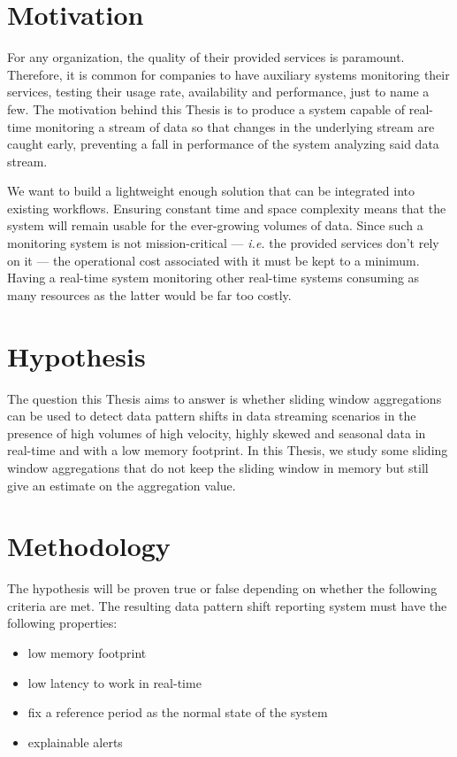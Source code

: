 \section{Motivation} \label{sec:motivation}
For any organization, the quality of their provided services is paramount. Therefore, it is common for companies to have auxiliary systems monitoring their services, testing their usage rate, availability and performance, just to name a few. The motivation behind this Thesis is to produce a system capable of real-time monitoring a stream of data so that changes in the underlying stream are caught early, preventing a fall in performance of the system analyzing said data stream. 

We want to build a lightweight enough solution that can be integrated into existing workflows. Ensuring constant time and space complexity means that the system will remain usable for the ever-growing volumes of data. Since such a monitoring system is not mission-critical --- \textit{i.e.} the provided services don't rely on it --- the operational cost associated with it must be kept to a minimum. Having a real-time system monitoring other real-time systems consuming as many resources as the latter would be far too costly.

\section{Hypothesis} \label{sec:hypothesis}
The question this Thesis aims to answer is whether sliding window aggregations can be used to detect data pattern shifts in data streaming scenarios in the presence of high volumes of high velocity, highly skewed and seasonal data in real-time and with a low memory footprint. In this Thesis, we study some sliding window aggregations that do not keep the sliding window in memory but still give an estimate on the aggregation value.

\section{Methodology} \label{sec:methodology}

The hypothesis will be proven true or false depending on whether the following criteria are met. The resulting data pattern shift reporting system must have the following properties:
\begin{itemize}
    \item low memory footprint
    
    \item low latency to work in real-time
    
    \item fix a reference period as the normal state of the system
    
    \item explainable alerts
\end{itemize}

